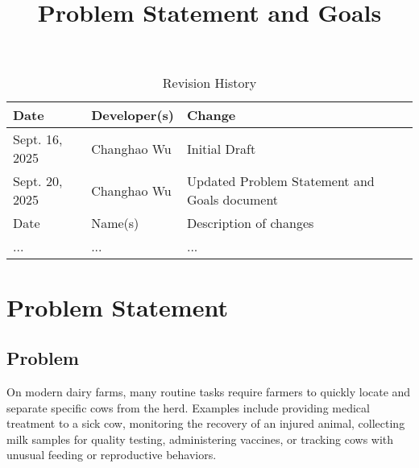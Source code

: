 \documentclass{article}
\title{Problem Statement and Goals\\\progname}
\author{\authname}
\date{}
\begin{document}
\maketitle

\begin{table}[hp]
    \caption{Revision History} \label{TblRevisionHistory}
        \begin{tabularx}{\textwidth}{llX}
        \toprule
        \textbf{Date} & \textbf{Developer(s)} & \textbf{Change}\\
        \midrule
            Sept. 16, 2025  & Changhao Wu           & Initial Draft                                 \\
            Sept. 20, 2025  & Changhao Wu           & Updated Problem Statement and Goals document  \\
            Date            & Name(s)               & Description of changes                        \\
            ...             & ...                   & ...                                           \\
        \bottomrule
        \end{tabularx}
\end{table}

\section{Problem Statement}




\subsection{Problem}

    On modern dairy farms, many routine tasks require farmers to quickly locate and 
    separate specific cows from the herd. Examples include providing medical treatment 
    to a sick cow, monitoring the recovery of an injured animal, collecting milk samples 
    for quality testing, administering vaccines, or tracking cows with unusual feeding 
    or reproductive behaviors.  

    \setlength{\parskip}{0.6em} 
\end{document}
